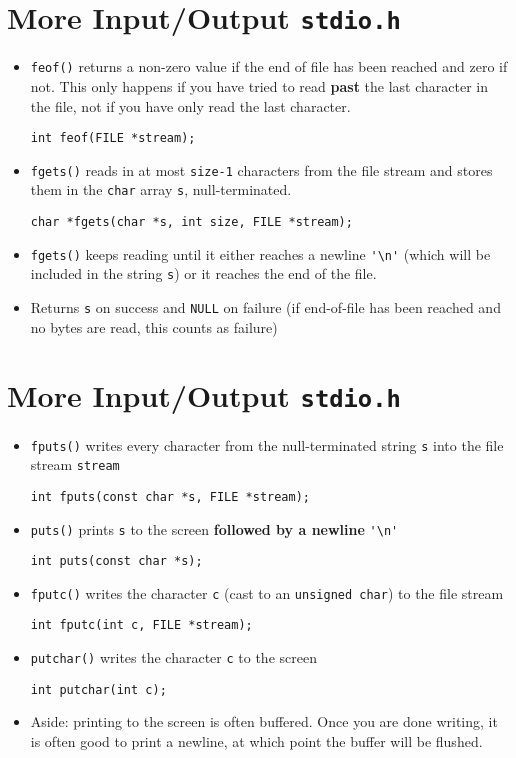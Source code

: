 \documentclass{article}
\begin{document}
\section{More Input/Output \texttt{stdio.h}}
\begin{itemize}
\item \verb!feof()! returns a non-zero value if the end of file has been reached and zero if not. This only happens if you have tried to read \textbf{past} the last character in the file, not if you have only read the last character.
\begin{verbatim}
int feof(FILE *stream);
\end{verbatim}
\item \verb!fgets()! reads in at most \verb!size-1! characters from the file stream and stores them in the \verb!char! array \verb!s!, null-terminated.
\begin{verbatim}
char *fgets(char *s, int size, FILE *stream);
\end{verbatim}
\item \verb!fgets()! keeps reading until it either reaches a newline \verb!'\n'! (which will be included in the string \verb!s!) or it reaches the end of the file.
\item Returns \verb!s! on success and \verb!NULL! on failure (if end-of-file has been reached and no bytes are read, this counts as failure)
\end{itemize}



\section{More Input/Output \texttt{stdio.h}}
\begin{itemize}
\item \verb!fputs()! writes every character from the null-terminated string \verb!s! into the file stream \verb!stream!
\begin{verbatim}
int fputs(const char *s, FILE *stream);
\end{verbatim}
\item \verb!puts()! prints \verb!s! to the screen \textbf{followed by a newline} \verb!'\n'!
\begin{verbatim}
int puts(const char *s);
\end{verbatim}
\item \verb!fputc()! writes the character \verb!c! (cast to an \verb!unsigned char!) to the file stream
\begin{verbatim}
int fputc(int c, FILE *stream);
\end{verbatim}
\item \verb!putchar()! writes the character \verb!c! to the screen
\begin{verbatim}
int putchar(int c);
\end{verbatim}

\item Aside: printing to the screen is often buffered. Once you are done writing, it is often good to print a newline, at which point the buffer will be flushed.
\end{itemize}
\end{document}
